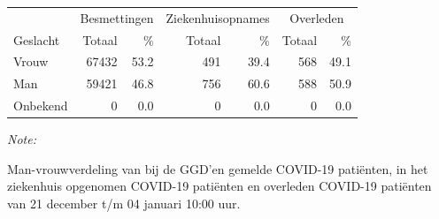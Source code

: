 \documentclass[
  english,
  man,floatsintext]{apa6}
\begin{document}
\begin{table}[H]
\centering\begingroup\fontsize{11}{13}\selectfont

\begin{threeparttable}
\begin{tabular}{lrrrrrr}
\toprule
\multicolumn{1}{c}{ } & \multicolumn{2}{c}{Besmettingen} & \multicolumn{2}{c}{Ziekenhuisopnames} & \multicolumn{2}{c}{Overleden} \\
\cmidrule(l{3pt}r{3pt}){2-3} \cmidrule(l{3pt}r{3pt}){4-5} \cmidrule(l{3pt}r{3pt}){6-7}
Geslacht & Totaal & \% & Totaal & \% & Totaal & \%\\
\midrule
Vrouw & 67432 & 53.2 & 491 & 39.4 & 568 & 49.1\\
Man & 59421 & 46.8 & 756 & 60.6 & 588 & 50.9\\
Onbekend & 0 & 0.0 & 0 & 0.0 & 0 & 0.0\\
\bottomrule
\end{tabular}
\begin{tablenotes}
\item \textit{Note: } 
\item Man-vrouwverdeling van bij de GGD’en gemelde COVID-19 patiënten, in het ziekenhuis opgenomen COVID-19 patiënten en overleden COVID-19 patiënten van 21 december t/m 04 januari 10:00 uur.
\end{tablenotes}
\end{threeparttable}
\endgroup{}
\end{table}
\newpage
\end{document}
